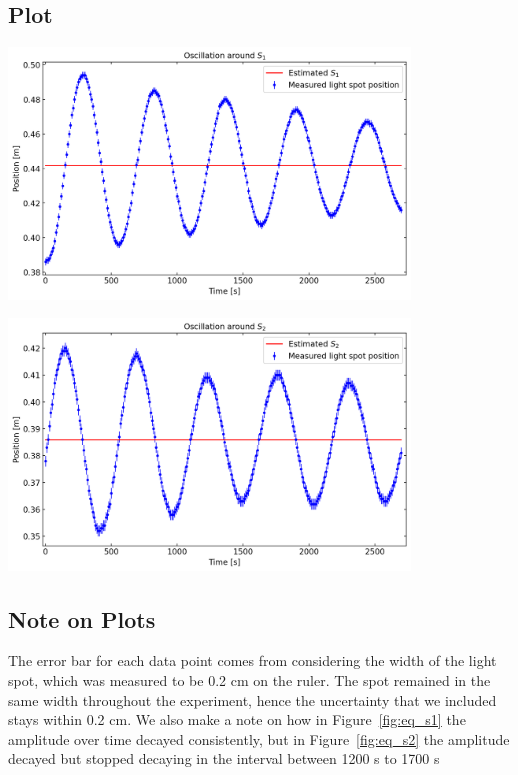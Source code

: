 \documentclass{article}
\begin{document}
\subsection{Plot}

\begin{center}
    \includegraphics[width = 0.8\textwidth]{figures/Position 1.png}
    \label{fig:eq_s1}
\end{center}


\begin{center}
\includegraphics[width = 0.8\textwidth]{figures/Position 2.png}
\label{fig:eq_s2}    
\end{center}


\subsection{Note on Plots}
The error bar for each data point comes from considering the width of the light spot, which was measured to be 0.2 cm on the ruler. The spot remained in the same width throughout the experiment, hence the uncertainty that we included stays within 0.2 cm. We also make a note on how in Figure~\ref{fig:eq_s1} the amplitude over time decayed consistently, but in Figure~\ref{fig:eq_s2} the amplitude decayed but stopped decaying in the interval between 1200 s to 1700 s
\end{document}
